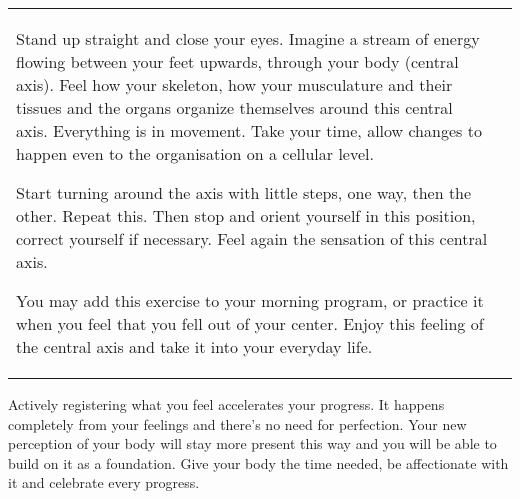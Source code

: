 \documentclass[../main.tex]{subfiles}
\begin{document}
\noindent
\begin{tabular}{p{6cm}p{5.9cm}}
  {Stand\label{Ex:CentralAxis}\index{exercise!central axis} up} straight and close your eyes.
Imagine a {stream of energy} flowing between your feet upwards, through your body (central axis).
Feel how your skeleton, how your musculature and their tissues and the organs {organize themselves around this central axis}.
Everything is in movement.
Take your time, allow changes to happen even to the organisation on a cellular level.

Start {turning} around the axis with little steps, one way, then the other.
{Repeat this}.
Then stop and {orient yourself} in this position, correct yourself if necessary.
Feel again the sensation of this central axis.

You may add this exercise to your {morning program},
or practice it when you feel that you fell out of your {center}.
  Enjoy this feeling of the central axis and take it into your everyday life. &
  \raisebox{-\totalheight}{  \texttt{[image: Normal\_Posture]} } \\

\end{tabular}

{Actively registering} what you feel accelerates your progress.
It happens completely from your {feelings} and there's no need for perfection.
Your new {perception of your body} will stay more present this way and you will be able to {build on it} as a foundation.
Give your body the time needed, be {affectionate} with it and celebrate every progress.
\end{document}
